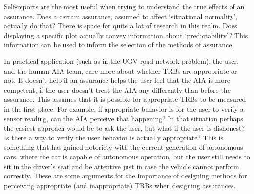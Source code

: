     Self-reports are the most useful when trying to understand the true effects of an assurance. Does a certain assurance, assumed to affect `situational normality', actually do that? There is space for quite a lot of research in this realm. Does displaying a specific plot actually convey information about `predictability'? This information can be used to inform the selection of the methods of assurance.

    In practical application (such as in the UGV road-network problem), the user, and the human-AIA team, care more about whether TRBs are appropriate or not. It doesn't help if an assurance helps the user feel that the AIA is more competent, if the user doesn't treat the AIA any differently than before the assurance. This assumes that it is possible for appropriate TRBs to be measured in the first place. For example, if appropriate behavior is for the user to verify a sensor reading, can the AIA perceive that happening? In that situation perhaps the easiest approach would be to ask the user, but what if the user is dishonest? Is there a way to verify the user behavior is actually appropriate? This is something that has gained notoriety with the current generation of autonomous cars, where the car is capable of autonomous operation, but the user still needs to sit in the driver's seat and be attentive just in case the vehicle cannot perform correctly. These are some arguments for the importance of designing methods for perceiving appropriate (and inappropriate) TRBs when designing assurances. 
%
%
%
